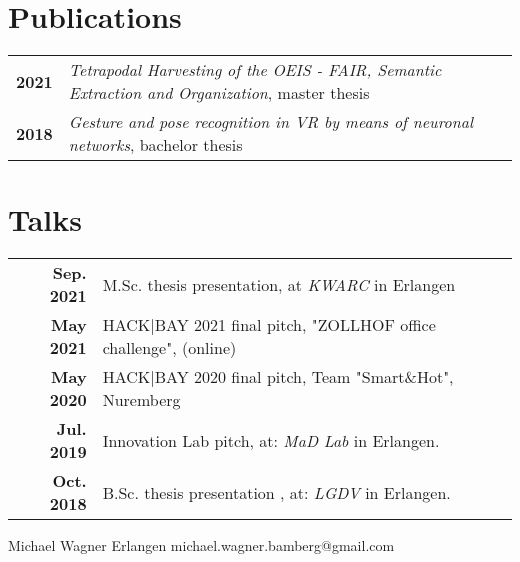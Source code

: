 \documentclass[michiscolours]{hipstercv}
\newlength{\rightcolwidth}
\begin{document}
\begin{paracol}{2}
\begin{minipage}[t]{0.3\textwidth}
\begin{tabular}{>{\footnotesize\bfseries}r >{\footnotesize}p{}}
\end{tabular}
\end{minipage}\hfill
\begin{minipage}[t]{0.3\textwidth}
\section*{Publications}
\begin{tabular}{>{\footnotesize\bfseries}r >{\footnotesize}p{}}
    2021 & \emph{Tetrapodal Harvesting of the OEIS - FAIR, Semantic Extraction and Organization}, master thesis \\
    2018 & \emph{Gesture and pose recognition in VR by means of neuronal networks}, bachelor thesis 
\end{tabular}
\section*{Talks}
\begin{tabular}{>{\footnotesize\bfseries}r >{\footnotesize}p{}}
    Sep. 2021& M.Sc. thesis presentation, at \emph{KWARC} in Erlangen \\
    May 2021& HACK|BAY 2021 final pitch, "ZOLLHOF office challenge",  (online) \\
    May 2020& HACK|BAY 2020 final pitch, Team "Smart\&Hot", Nuremberg \\
    Jul. 2019& Innovation Lab pitch, at: \emph{MaD Lab} in Erlangen.\\
    Oct. 2018& B.Sc. thesis presentation , at: \emph{LGDV} in Erlangen. \\
\end{tabular}
\end{minipage}


\vfill{} %
\setlength{\parindent}{0pt}
\begin{minipage}[t]{\rightcolwidth}
\begin{center}\fontfamily{\sfdefault}\selectfont \color{black!70}
{
\small Michael Wagner 
 Erlangen 
 michael.wagner.bamberg@gmail.com \newline 

}
\end{center}
\end{minipage}
\end{paracol}
\end{document}
